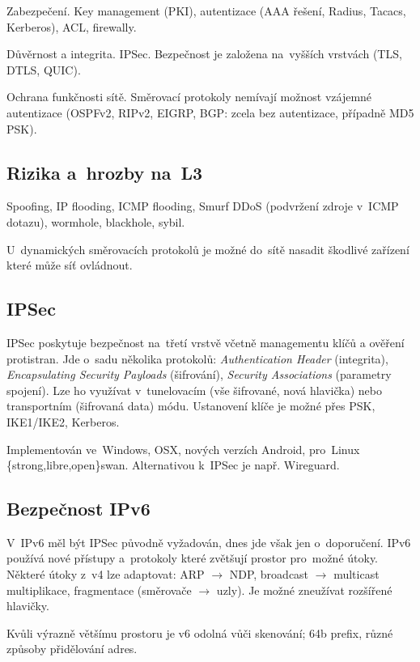 Zabezpečení.
Key management (PKI), autentizace (AAA řešení, Radius, Tacacs, Kerberos), ACL, firewally.

Důvěrnost a integrita.
IPSec.
Bezpečnost je založena na~vyšších vrstvách (TLS, DTLS, QUIC).

Ochrana funkčnosti sítě.
Směrovací protokoly nemívají možnost vzájemné autentizace (OSPFv2, RIPv2, EIGRP, BGP: zcela bez autentizace, případně MD5 PSK).


\subsection{Rizika a~hrozby na~L3}

Spoofing, IP flooding, ICMP flooding, Smurf DDoS (podvržení zdroje v~ICMP dotazu), wormhole, blackhole, sybil.

U~dynamických směrovacích protokolů je možné do~sítě nasadit škodlivé zařízení které může síť ovládnout.


\subsection{IPSec}

IPSec poskytuje bezpečnost na~třetí vrstvě včetně managementu klíčů a ověření protistran.
Jde o~sadu několika protokolů: \emph{Authentication Header} (integrita), \emph{Encapsulating Security Payloads} (šifrování), \emph{Security Associations} (parametry spojení).
Lze ho využívat v~tunelovacím (vše šifrované, nová hlavička) nebo transportním (šifrovaná data) módu.
Ustanovení klíče je možné přes PSK, IKE1/IKE2, Kerberos.

Implementován ve~Windows, OSX, nových verzích Android, pro~Linux \{strong,libre,open\}swan.
Alternativou k~IPSec je např. Wireguard.


\subsection{Bezpečnost IPv6}

V~IPv6 měl být IPSec původně vyžadován, dnes jde však jen o~doporučení.
IPv6 používá nové přístupy a~protokoly které zvětšují prostor pro~možné útoky.
Některé útoky z~v4 lze adaptovat: ARP $\rightarrow$ NDP, broadcast $\rightarrow$ multicast multiplikace, fragmentace (směrovače $\rightarrow$ uzly).
Je možné zneužívat rozšířené hlavičky.

Kvůli výrazně většímu prostoru je v6 odolná vůči skenování; 64b prefix, různé způsoby přidělování adres.

